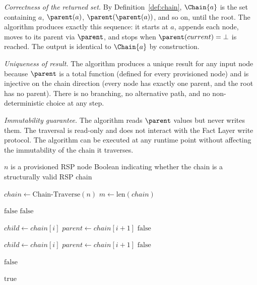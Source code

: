 \textit{Correctness of the returned set.} By Definition~\ref{def:chain}, $\Chain{a}$ is the set containing $a$, $\parent(a)$, $\parent(\parent(a))$, and so on, until the root. The algorithm produces exactly this sequence: it starts at $a$, appends each node, moves to its parent via $\parent$, and stops when $\parent(current) = \bot$ is reached. The output is identical to $\Chain{a}$ by construction.

\textit{Uniqueness of result.} The algorithm produces a unique result for any input node because $\parent$ is a total function (defined for every provisioned node) and is injective on the chain direction (every node has exactly one parent, and the root has no parent). There is no branching, no alternative path, and no non-deterministic choice at any step.

\textit{Immutability guarantee.} The algorithm reads $\parent$ values but never writes them. The traversal is read-only and does not interact with the Fact Layer write protocol. The algorithm can be executed at any runtime point without affecting the immutability of the chain it traverses.

\begin{algorithm}
\caption{Chain-Verify($n$) --- Verify the structural validity of the authorization chain from node $n$}
\label{alg:chain-verify}
\begin{algorithmic}[1]
\REQUIRE $n$ is a provisioned RSP node
\ENSURE Boolean indicating whether the chain is a structurally valid RSP chain

\STATE $chain \leftarrow \text{Chain-Traverse}(n)$
\STATE $m \leftarrow \text{len}(chain)$

\STATE {}
    \STATE \RETURN $\text{false}$ 
\ENDIF
{}
    \STATE \RETURN $\text{false}$ 
\ENDIF

\STATE {}
    \STATE $child \leftarrow chain[i]$
    \STATE $parent \leftarrow chain[i+1]$
        \STATE \RETURN $\text{false}$ 
    \ENDIF
\ENDFOR

\STATE {}
    \STATE $child \leftarrow chain[i]$
    \STATE $parent \leftarrow chain[i+1]$
        \STATE \RETURN $\text{false}$ 
    \ENDIF
\ENDFOR

\STATE {}
        \STATE \RETURN $\text{false}$ 
    \ENDIF
\ENDFOR

\RETURN $\text{true}$
\end{algorithmic}
\end{algorithm}

